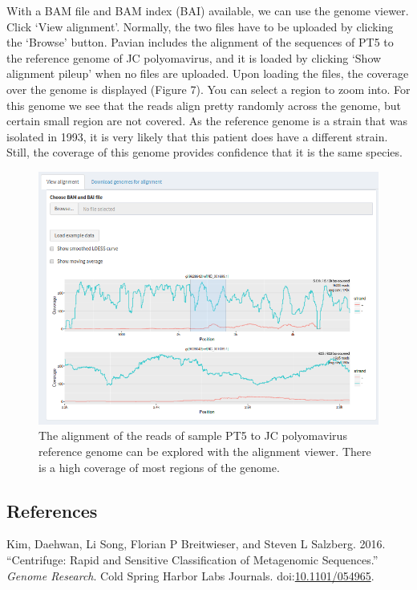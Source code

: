 \documentclass[]{article}
\begin{document}
With a BAM file and BAM index (BAI) available, we can use the genome
viewer. Click `View alignment'. Normally, the two files have to be
uploaded by clicking the `Browse' button. Pavian includes the alignment
of the sequences of PT5 to the reference genome of JC polyomavirus, and
it is loaded by clicking `Show alignment pileup' when no files are
uploaded. Upon loading the files, the coverage over the genome is
displayed (Figure 7). You can select a region to zoom into. For this
genome we see that the reads align pretty randomly across the genome,
but certain small region are not covered. As the reference genome is a
strain that was isolated in 1993, it is very likely that this patient
does have a different strain. Still, the coverage of this genome
provides confidence that it is the same species.

\begin{figure}[htbp]
\centering
\includegraphics{alignment-viewer-pt5.png}
\caption{The alignment of the reads of sample PT5 to JC polyomavirus
reference genome can be explored with the alignment viewer. There is a
high coverage of most regions of the genome.}
\end{figure}

\clearpage

\subsection*{References}\label{references}

\hypertarget{refs}{}
\hypertarget{ref-DKim_SSalzber2016-Biorxiv}{}
Kim, Daehwan, Li Song, Florian P Breitwieser, and Steven L Salzberg.
2016. ``Centrifuge: Rapid and Sensitive Classification of Metagenomic
Sequences.'' \emph{Genome Research}. Cold Spring Harbor Labs Journals.
doi:\href{https://doi.org/10.1101/054965}{10.1101/054965}.
\end{document}
